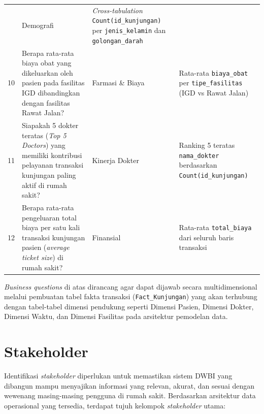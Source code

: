 \begin{table}[H]
\begin{tabularx}{\linewidth}{cp{5.5cm}p{2.5cm}X}
   & Demografi
   & \textit{Cross-tabulation} \texttt{Count(id\_kunjungan)} per \texttt{jenis\_kelamin} dan \texttt{golongan\_darah} \\[3pt]
10 & Berapa rata-rata biaya obat yang dikeluarkan oleh pasien pada fasilitas IGD dibandingkan dengan fasilitas Rawat Jalan?
   & Farmasi \& Biaya
   & Rata-rata \texttt{biaya\_obat} per \texttt{tipe\_fasilitas} (IGD vs Rawat Jalan) \\[3pt]
11 & Siapakah 5 dokter teratas (\textit{Top 5 Doctors}) yang memiliki kontribusi pelayanan transaksi kunjungan paling aktif di rumah sakit?
   & Kinerja Dokter
   & Ranking 5 teratas \texttt{nama\_dokter} berdasarkan \texttt{Count(id\_kunjungan)} \\[3pt]
12 & Berapa rata-rata pengeluaran total biaya per satu kali transaksi kunjungan pasien (\textit{average ticket size}) di rumah sakit?
   & Finansial
   & Rata-rata \texttt{total\_biaya} dari seluruh baris transaksi \\
\bottomrule
\end{tabularx}
\end{table}
 
\textit{Business questions} di atas dirancang agar dapat dijawab secara multidimensional melalui pembuatan tabel fakta transaksi (\texttt{Fact\_Kunjungan}) yang akan terhubung dengan tabel-tabel dimensi pendukung seperti Dimensi Pasien, Dimensi Dokter, Dimensi Waktu, dan Dimensi Fasilitas pada arsitektur pemodelan data.
 
\section{Stakeholder}
 
Identifikasi \textit{stakeholder} diperlukan untuk memastikan sistem DWBI yang dibangun mampu menyajikan informasi yang relevan, akurat, dan sesuai dengan wewenang masing-masing pengguna di rumah sakit. Berdasarkan arsitektur data operasional yang tersedia, terdapat tujuh kelompok \textit{stakeholder} utama:
 
